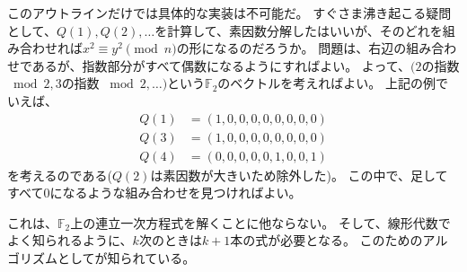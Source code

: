 このアウトラインだけでは具体的な実装は不可能だ。
すぐさま沸き起こる疑問として、$Q(1), Q(2),\ldots$を計算して、素因数分解したはいいが、そのどれを組み合わせれば$x^2\equiv y^2 \pmod{n}$の形になるのだろうか。
問題は、右辺の組み合わせであるが、指数部分がすべて偶数になるようにすればよい。
よって、$(2$の指数$\bmod{2}, 3$の指数 $\bmod{2}, \ldots)$という$\mathbb{F}_2$のベクトルを考えればよい。
上記の例でいえば、
\begin{align*}
Q(1) &= (1, 0, 0, 0, 0, 0, 0, 0, 0)\\
Q(3) &= (1, 0, 0, 0, 0, 0, 0, 0, 0)\\
Q(4) &= (0, 0, 0, 0, 0, 1, 0, 0, 1)
\end{align*}
を考えるのである($Q(2)$は素因数が大きいため除外した)。
この中で、足してすべて$0$になるような組み合わせを見つければよい。

これは、$\mathbb{F}_2$上の連立一次方程式を解くことに他ならない。
そして、線形代数でよく知られるように、$k$次のときは$k+1$本の式が必要となる。
このためのアルゴリズムとしてが知られている。

